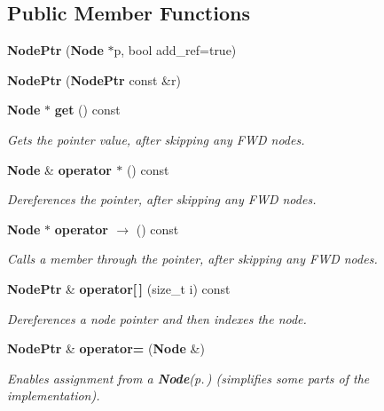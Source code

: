 \subsection*{Public Member Functions}
\begin{CompactItemize}
\item 
{\bf Node\-Ptr} ({\bf Node} $\ast$p, bool add\_\-ref=true)\label{structsprite_1_1NodePtr_a1}

\item 
{\bf Node\-Ptr} ({\bf Node\-Ptr} const \&r)\label{structsprite_1_1NodePtr_a2}

\item 
{\bf Node} $\ast$ {\bf get} () const \label{structsprite_1_1NodePtr_a3}

\begin{CompactList}\small\item\em Gets the pointer value, after skipping any FWD nodes. \item\end{CompactList}\item 
{\bf Node} \& {\bf operator $\ast$} () const 
\begin{CompactList}\small\item\em Dereferences the pointer, after skipping any FWD nodes. \item\end{CompactList}\item 
{\bf Node} $\ast$ {\bf operator $\rightarrow$ } () const 
\begin{CompactList}\small\item\em Calls a member through the pointer, after skipping any FWD nodes. \item\end{CompactList}\item 
{\bf Node\-Ptr} \& {\bf operator[$\,$]} (size\_\-t i) const 
\begin{CompactList}\small\item\em Dereferences a node pointer and then indexes the node. \item\end{CompactList}\item 
{\bf Node\-Ptr} \& {\bf operator=} ({\bf Node} \&)\label{structsprite_1_1NodePtr_a7}

\begin{CompactList}\small\item\em Enables assignment from a {\bf Node}{\rm (p.\,\pageref{structsprite_1_1Node})} (simplifies some parts of the implementation). \item\end{CompactList}\end{CompactItemize}


